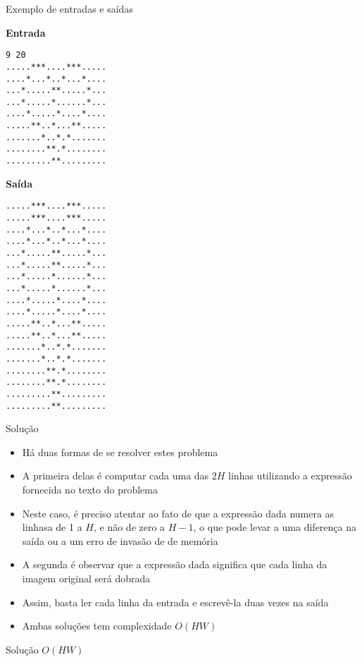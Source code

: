 \begin{frame}[fragile]{Exemplo de entradas e saídas}

\begin{footnotesize}
\begin{minipage}[t]{0.45\textwidth}
\textbf{Entrada}
\begin{verbatim}
9 20
.....***....***.....
....*...*..*...*....
...*.....**.....*...
...*.....*......*...
....*.....*....*....
.....**..*...**.....
.......*..*.*.......
........**.*........
.........**.........
\end{verbatim}
\end{minipage}
\begin{minipage}[t]{0.5\textwidth}
\textbf{Saída}
\begin{verbatim}
.....***....***.....
.....***....***.....
....*...*..*...*....
....*...*..*...*....
...*.....**.....*...
...*.....**.....*...
...*.....*......*...
...*.....*......*...
....*.....*....*....
....*.....*....*....
.....**..*...**.....
.....**..*...**.....
.......*..*.*.......
.......*..*.*.......
........**.*........
........**.*........
.........**.........
.........**.........
\end{verbatim}
\end{minipage}
\end{footnotesize}
\end{frame}


\begin{frame}[fragile]{Solução}

    \begin{itemize}
        \item Há duas formas de se resolver estes problema
            
        \item A primeira delas é computar cada uma das $2H$ linhas utilizando a expressão
            fornecida no texto do problema

        \item Neste caso, é preciso atentar ao fato de que a expressão dada numera as
            linhasa de 1 a $H$, e não de zero a $H - 1$, o que pode levar a uma diferença
            na saída ou a um erro de invasão de de memória

        \item A segunda é observar que a expressão dada significa que cada linha da imagem
            original será dobrada

        \item Assim, basta ler cada linha da entrada e escrevê-la duas vezes na saída

        \item Ambas soluções tem complexidade $O(HW)$
    \end{itemize}

\end{frame}

\begin{frame}[fragile]{Solução $O(HW)$}
\end{frame}
